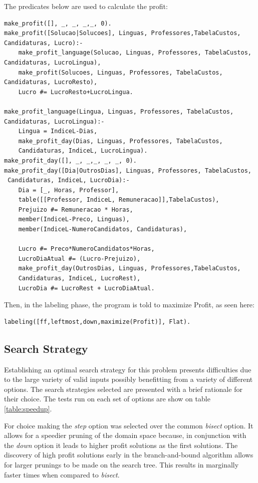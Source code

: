 \documentclass{llncs}
\begin{document}
The predicates below are used to calculate the profit:
\begin{verbatim}
make_profit([], _, _, _,_, 0).
make_profit([Solucao|Solucoes], Linguas, Professores,TabelaCustos, Candidaturas, Lucro):-
	make_profit_language(Solucao, Linguas, Professores, TabelaCustos, Candidaturas, LucroLingua),
	make_profit(Solucoes, Linguas, Professores, TabelaCustos, Candidaturas, LucroResto),
	Lucro #= LucroResto+LucroLingua.

make_profit_language(Lingua, Linguas, Professores, TabelaCustos, 
Candidaturas, LucroLingua):-
	Lingua = IndiceL-Dias,
	make_profit_day(Dias, Linguas, Professores, TabelaCustos, 
	Candidaturas, IndiceL, LucroLingua).
make_profit_day([], _, _,_, _, _, 0).
make_profit_day([Dia|OutrosDias], Linguas, Professores, TabelaCustos,
 Candidaturas, IndiceL, LucroDia):-
	Dia = [_, Horas, Professor],
	table([[Professor, IndiceL, Remuneracao]],TabelaCustos),
	Prejuizo #= Remuneracao * Horas,
	member(IndiceL-Preco, Linguas),
	member(IndiceL-NumeroCandidatos, Candidaturas),

	Lucro #= Preco*NumeroCandidatos*Horas,
	LucroDiaAtual #= (Lucro-Prejuizo),
	make_profit_day(OutrosDias, Linguas, Professores,TabelaCustos, 
	Candidaturas, IndiceL, LucroRest),
	LucroDia #= LucroRest + LucroDiaAtual.
\end{verbatim}

Then, in the labeling phase, the program is told to maximize Profit, as seen here:

\begin{verbatim}
labeling([ff,leftmost,down,maximize(Profit)], Flat).
\end{verbatim}

\subsection{Search Strategy}
Establishing an optimal search strategy for this problem presents difficulties due to the large variety of valid inputs possibly benefitting from a variety of different options. The search strategies selected are presented with a brief rationale for their choice. The tests run on each set of options are show on table \ref{table:speedup}. 


For choice making the \textit{step} option was selected over the common \textit{bisect} option. It allows for a speedier pruning of the domain space because, in conjunction with the \textit{down} option it leads to higher profit solutions as the first solutions. The discovery of high profit solutions early in the branch-and-bound algorithm allows for larger prunings to be made on the search tree. This results in marginally faster times when compared to \textit{bisect}.
\end{document}
